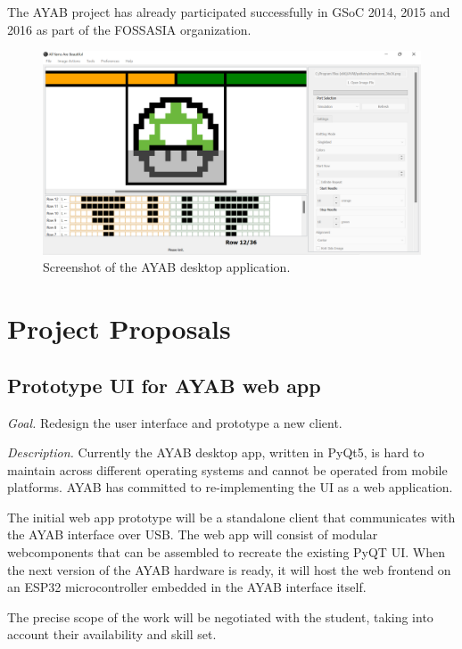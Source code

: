 \documentclass{article}
\begin{document}
The AYAB project has already participated successfully in GSoC 2014, 2015 and 2016 as part of the FOSSASIA organization.

\newpage
\begin{figure}
    \centering
    \includegraphics[width=\textwidth]{ayab-app-screenshot.png}
    \caption{Screenshot of the AYAB desktop application.}
    \label{fig:1}
\end{figure}


\section{Project Proposals}

\subsection{Prototype UI for AYAB web app}

\textit{Goal.} Redesign the user interface and prototype a new client.

\textit{Description.} Currently the AYAB desktop app, written in PyQt5, is hard to maintain across different operating systems and cannot be operated from mobile platforms. AYAB has committed to re-implementing the UI as a web application.

The initial web app prototype will be a standalone client that communicates with the AYAB interface over USB. The web app will consist of modular webcomponents that can be assembled to recreate the existing PyQT UI. When the next version of the AYAB hardware is ready, it will host the web frontend on an ESP32 microcontroller embedded in the AYAB interface itself.

The precise scope of the work will be negotiated with the student, taking into account their availability and skill set.
\end{document}
